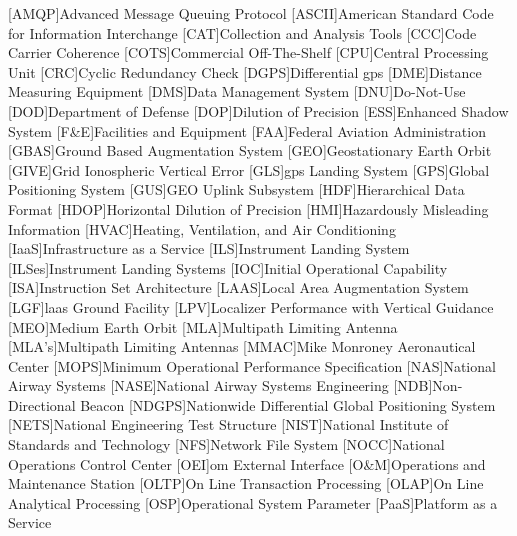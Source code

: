 \begin{acronym}[WAAS]
[AMQP]{Advanced Message Queuing Protocol}
[ASCII]{American Standard Code for Information Interchange}
[CAT]{Collection and Analysis Tools}
[CCC]{Code Carrier Coherence}
[COTS]{Commercial Off-The-Shelf}
[CPU]{Central Processing Unit}
[CRC]{Cyclic Redundancy Check}
[DGPS]{Differential \ac{gps}}
[DME]{Distance Measuring Equipment}
[DMS]{Data Management System}
[DNU]{Do-Not-Use}
[DOD]{Department of Defense}
[DOP]{Dilution of Precision}
[ESS]{Enhanced Shadow System}
[F\&E]{Facilities and Equipment}
[FAA]{Federal Aviation Administration}
[GBAS]{Ground Based Augmentation System}
[GEO]{Geostationary Earth Orbit}
[GIVE]{Grid Ionospheric Vertical Error}
[GLS]{\ac{gps} Landing System}
[GPS]{Global Positioning System}
[GUS]{GEO Uplink Subsystem}
[HDF]{Hierarchical Data Format}
[HDOP]{Horizontal Dilution of Precision}
[HMI]{Hazardously Misleading Information}
[HVAC]{Heating, Ventilation, and Air Conditioning}
[IaaS]{Infrastructure as a Service}
[ILS]{Instrument Landing System}
[ILSes]{Instrument Landing Systems}
[IOC]{Initial Operational Capability}
[ISA]{Instruction Set Architecture}
[LAAS]{Local Area Augmentation System}
[LGF]{\ac{laas} Ground Facility}
[LPV]{Localizer Performance with Vertical Guidance}
[MEO]{Medium Earth Orbit}
[MLA]{Multipath Limiting Antenna}
[MLA's]{Multipath Limiting Antennas}
[MMAC]{Mike Monroney Aeronautical Center}
[MOPS]{Minimum Operational Performance Specification}
[NAS]{National Airway Systems}
[NASE]{National Airway Systems Engineering}
[NDB]{Non-Directional Beacon}
[NDGPS]{Nationwide Differential Global Positioning System}
[NETS]{National Engineering Test Structure}
[NIST]{National Institute of Standards and Technology}
[NFS]{Network File System}
[NOCC]{National Operations Control Center}
[OEI]{\ac{om} External Interface}
[O\&M]{Operations and Maintenance Station}
[OLTP]{On Line Transaction Processing}
[OLAP]{On Line Analytical Processing}
[OSP]{Operational System Parameter}
[PaaS]{Platform as a Service}

\end{acronym}
